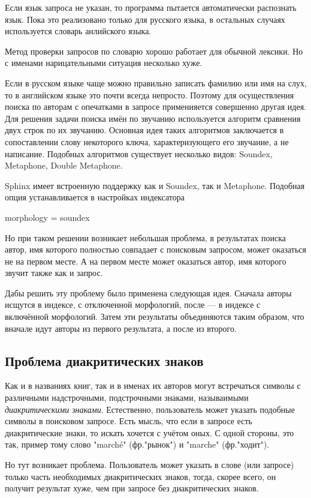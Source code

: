 Если язык запроса не указан, то программа пытается автоматически распознать язык.
Пока это реализовано только для русского языка, в остальных случаях используется словарь анлийского языка.

Метод проверки запросов по словарю хорошо работает для обычной лексики. Но с именами нарицательными ситуация несколько хуже.

Если в русском языке чаще можно правильно записать фамилию или имя на слух, то в английском языке это почти всегда непросто.
Поэтому для осуществления поиска по авторам с опечатками в запросе применияется совершенно другая идея.
Для решения задачи поиска имён по звучанию используется алгоритм сравнения двух строк по их звучанию.
Основная идея таких алгоритмов заключается в сопоставлении слову некоторого ключа, характеризующего его звучание, а не написание.
Подобных алгоритмов существует несколько видов: Soundex, Metaphone, Double Metaphone.

Sphinx имеет встроенную поддержку как и Soundex, так и Metaphone. Подобная опция устанавливается в настройках индексатора

morphology = soundex


Но при таком решении возникает небольшая проблема, в результатах поиска автор, имя которого полностью совпадает с поисковым запросом, может оказаться не на первом месте. А на первом месте может оказаться автор, имя которого звучит также как и запрос.

Дабы решить эту проблему было применена следующая идея. 
Сначала авторы исщутся в индексе, с отключенной морфологий, после --- в индексе с включённой морфологий.
Затем эти результаты объединяются таким образом, что вначале идут авторы из первого результата, а после из второго.

\subsection{Проблема диакритических знаков}

Как и в названиях книг, так и в именах их авторов могут встречаться символы с различными надстрочными, подстрочными знаками, называимыми {\em диакритическими знаками}. Естественно, пользователь может указать подобные символы в поисковом запросе.
Есть мысль, что если в запросе есть диакритические знаки, то искать хочется с учётом оных. С одной стороны, это так, пример тому слово "marché" (фр."рынок") и "marche" (фр."ходит"). 

Но тут возникает проблема. Пользователь может указать в слове (или запросе) только часть необходимых диакритических знаков, тогда, скорее всего, он получит результат хуже, чем при запросе без диакритических знаков. 

